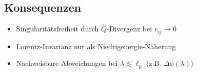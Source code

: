 \subsection{Konsequenzen}
\begin{itemize}
    \item Singularitätsfreiheit durch $\hat{Q}$-Divergenz bei $r_{ij}\to0$
    \item Lorentz-Invarianz nur als Niedrigenergie-Näherung
    \item Nachweisbare Abweichungen bei $\lambda\lesssim\ell_p$ (z.B. $\Delta\phi(\lambda)$)
\end{itemize}
